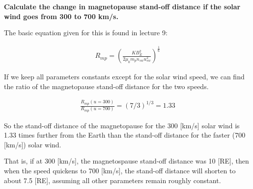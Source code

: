 \textbf{Calculate the change in magnetopause stand-off distance if the
solar wind goes from 300 to 700 km/s.}

The basic equation given for this is found in lecture 9:

\begin{gather*}
  R_{mp} =
  \left(\frac{KB_{E}^{2}}{2\mu_{0}m_{p}n_{sw}u_{sw}^{2}}\right)^{\frac{1}{6}}
\end{gather*}

If we keep all parameters constants except for the solar wind speed, we
can find the ratio of the magnetopause stand-off distance for the two
speeds.

\begin{gather*}
  \frac{R_{mp}(u=300)}{R_{mp}(u=700)} = (7/3)^{1/3} = 1.33
\end{gather*}

So the stand-off distance of the magnetopause for the 300 [km/s] solar
wind is 1.33 times further from the Earth than the stand-off distance
for the faster (700 [km/s]) solar wind. 

That is, if at 300 [km/s], the magnetospause stand-off distance was 10
[RE], then when the speed quickens to 700 [km/s], the stand-off distance
will shorten to about 7.5 [RE], assuming all other parameters remain
roughly constant.
